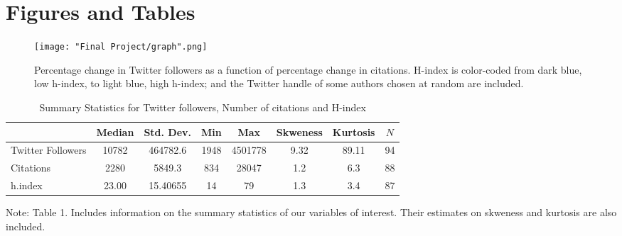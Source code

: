 \documentclass[12pt,english]{article}
\begin{document}
\vfill
\pagebreak{}
\begin{spacing}{1.0}


\end{spacing}

\vfill
\pagebreak{}
\clearpage

\section*{Figures and Tables}\label{sec:figTables}

\begin{figure}[ht]
\centering
\bigskip{}
\texttt{[image: "Final Project/graph".png]}
\caption{Percentage change in Twitter followers as a function of percentage change in citations. H-index is color-coded from dark blue, low h-index, to light blue, high h-index; and the Twitter handle of some authors chosen at random are included.}
\label{fig:fig1}
\end{figure}

\pagebreak{}

\begin{table}[ht]
    \caption{Summary Statistics for Twitter followers, Number of citations and H-index}
    \label{tab:descriptives} 
\centering
\begin{threeparttable}
\begin{tabular}{lccccccc}
\toprule
                    & Median & Std. Dev. & Min   & Max     & Skweness & Kurtosis & $N$ \\
\midrule
Twitter Followers   & 10782  & 464782.6  & 1948  & 4501778 & 9.32     & 89.11    & 94 \\
Citations           & 2280   & 5849.3    & 834   & 28047   & 1.2      & 6.3      & 88\\
h.index             & 23.00  & 15.40655  & 14    & 79      & 1.3      & 3.4      & 87\\
\bottomrule
\end{tabular}
\footnotesize Note: Table 1. Includes information on the summary statistics of our variables of interest. Their estimates on skweness and kurtosis are also included. 
\end{threeparttable}
\end{table}
\end{document}
